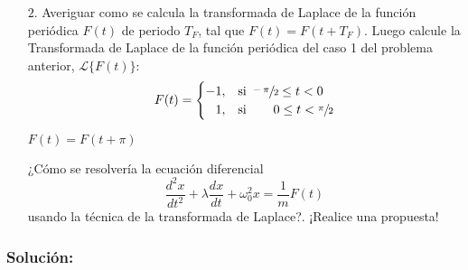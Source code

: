 \begin{multicols}{2}

\begin{enumerate}[leftmargin=15pt]
    \item[$2$.] Averiguar como se calcula la transformada de Laplace de la función periódica $F(t)$ de periodo $T_{F}$, tal que $F(t) =F(t+T_{F})$. Luego calcule la Transformada de Laplace de la función periódica  del caso 1 del problema anterior, $\mathscr{L}\{F(t)\}$:
    \begin{equation*}
        F(t) =
        \begin{cases}
        -1,&\text{si } \sfrac{-\pi}{2} \leq t < 0\\
        \hphantom{-}1,&\text{si } \hspace{18pt} 0 \leq t < \sfrac{\pi}{2}
        \end{cases}
    \end{equation*}
    \begin{center}$F(t)=F(t+\pi)$\end{center}
    
    ¿Cómo se resolvería la ecuación diferencial  \[\frac{d^2x}{dt^2}+\lambda\frac{dx}{dt}+\omega_{0}^2x= \frac{1}{m}F(t) \] usando la técnica de la transformada de Laplace?. ¡Realice una propuesta!
\end{enumerate}

\subsubsection*{Solución:}


\end{multicols}
